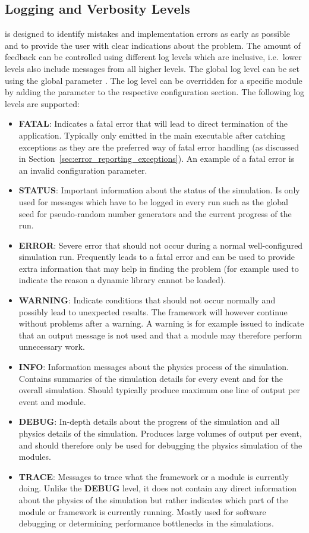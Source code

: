 \begin{itemize}
\section{Logging and Verbosity Levels}
\label{sec:logging_verbosity}
\apsq is designed to identify mistakes and implementation errors as early as possible and to provide the user with clear indications about the problem.
The amount of feedback can be controlled using different log levels which are inclusive, i.e.\ lower levels also include messages from all higher levels.
The global log level can be set using the global parameter .
The log level can be overridden for a specific module by adding the  parameter to the respective configuration section.
The following log levels are supported:
\begin{itemize}
\item \textbf{FATAL}: Indicates a fatal error that will lead to direct termination of the application.
Typically only emitted in the main executable after catching exceptions as they are the preferred way of fatal error handling (as discussed in Section~\ref{sec:error_reporting_exceptions}).
An example of a fatal error is an invalid configuration parameter.
\item \textbf{STATUS}: Important information about the status of the simulation.
Is only used for messages which have to be logged in every run such as the global seed for pseudo-random number generators and the current progress of the run.
\item \textbf{ERROR}: Severe error that should not occur during a normal well-configured simulation run.
Frequently leads to a fatal error and can be used to provide extra information that may help in finding the problem (for example used to indicate the reason a dynamic library cannot be loaded).
\item \textbf{WARNING}: Indicate conditions that should not occur normally and possibly lead to unexpected results.
The framework will however continue without problems after a warning.
A warning is for example issued to indicate that an output message is not used and that a module may therefore perform unnecessary work.
\item \textbf{INFO}: Information messages about the physics process of the simulation.
Contains summaries of the simulation details for every event and for the overall simulation.
Should typically produce maximum one line of output per event and module.
\item \textbf{DEBUG}: In-depth details about the progress of the simulation and all physics details of the simulation.
Produces large volumes of output per event, and should therefore only be used for  debugging the physics simulation of the modules.
\item \textbf{TRACE}: Messages to trace what the framework or a module is currently doing.
Unlike the \textbf{DEBUG} level, it does not contain any direct information about the physics of the simulation but rather indicates which part of the module or framework is currently running.
Mostly used for software debugging or determining performance bottlenecks in the simulations.
\end{itemize}


\end{itemize}
